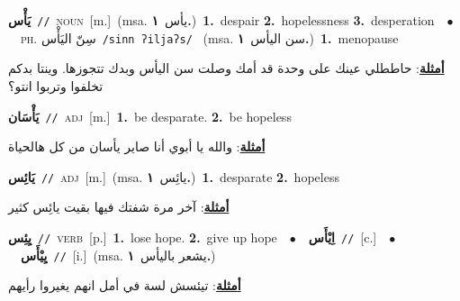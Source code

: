 \documentclass[10pt,a4paper,twoside]{article} %
\begin{document}
\begin{multicols}{2}
{\setlength\topsep{0pt}\textbf{\foreignlanguage{arabic}{يَأْس}}\ {\color{gray}\texttt{//}\color{black}}\ \textsc{noun}\ [m.]\ \color{gray}(msa. \foreignlanguage{arabic}{يأس}~\foreignlanguage{arabic}{\textbf{١.}})\color{black}\ \textbf{1.}~despair  \textbf{2.}~hopelessness  \textbf{3.}~desperation\ \ $\bullet$\ \ \textsc{ph.} \color{gray} \foreignlanguage{arabic}{سِنّ اليَأْس}\color{black}\ {\color{gray}\texttt{/{\sffamily sinn ʔiljaʔs}/}\color{black}}\ \color{gray} (msa. \foreignlanguage{arabic}{سن اليأس}~\foreignlanguage{arabic}{\textbf{١.}})\color{black}\ \textbf{1.}~menopause\  \begin{flushright}\color{gray}\foreignlanguage{arabic}{\textbf{\underline{\foreignlanguage{arabic}{أمثلة}}}: حاططلي عينك على وحدة قد أمك وصلت سن اليأس وبدك تتجوزها. وينتا بدكم تخلفوا وتربوا انتو؟}\end{flushright}\color{black}} \vspace{2mm}

{\setlength\topsep{0pt}\textbf{\foreignlanguage{arabic}{يَأْسَان}}\ {\color{gray}\texttt{//}\color{black}}\ \textsc{adj}\ [m.]\ \textbf{1.}~be desparate.  \textbf{2.}~be hopeless\  \begin{flushright}\color{gray}\foreignlanguage{arabic}{\textbf{\underline{\foreignlanguage{arabic}{أمثلة}}}: والله يا أبوي أنا صاير يأسان من كل هالحياة}\end{flushright}\color{black}} \vspace{2mm}

{\setlength\topsep{0pt}\textbf{\foreignlanguage{arabic}{يَائِس}}\ {\color{gray}\texttt{//}\color{black}}\ \textsc{adj}\ [m.]\ \color{gray}(msa. \foreignlanguage{arabic}{يائِس}~\foreignlanguage{arabic}{\textbf{١.}})\color{black}\ \textbf{1.}~desparate  \textbf{2.}~hopeless\  \begin{flushright}\color{gray}\foreignlanguage{arabic}{\textbf{\underline{\foreignlanguage{arabic}{أمثلة}}}: آخر مرة شفتك فيها بقيت يائِس كثير}\end{flushright}\color{black}} \vspace{2mm}

{\setlength\topsep{0pt}\textbf{\foreignlanguage{arabic}{يِئِس}}\ {\color{gray}\texttt{//}\color{black}}\ \textsc{verb}\ [p.]\ \textbf{1.}~lose hope.  \textbf{2.}~give up hope\ \ $\bullet$\ \ \setlength\topsep{0pt}\textbf{\foreignlanguage{arabic}{اِيْأَس}}\ {\color{gray}\texttt{//}\color{black}}\ [c.]\ \ $\bullet$\ \ \setlength\topsep{0pt}\textbf{\foreignlanguage{arabic}{يِيْأَس}}\ {\color{gray}\texttt{//}\color{black}}\ [i.]\ \color{gray}(msa. \foreignlanguage{arabic}{يشعر باليأس}~\foreignlanguage{arabic}{\textbf{١.}})\color{black}\  \begin{flushright}\color{gray}\foreignlanguage{arabic}{\textbf{\underline{\foreignlanguage{arabic}{أمثلة}}}: تيئسش لسة في أمل انهم يغيروا رأيهم}\end{flushright}\color{black}} \vspace{2mm}


\end{multicols}
\end{document}
